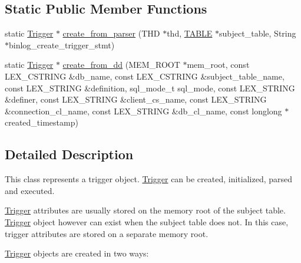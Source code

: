 \subsection*{Static Public Member Functions}
\begin{DoxyCompactItemize}
\item 
static \mbox{\hyperlink{classTrigger}{Trigger}} $\ast$ \mbox{\hyperlink{classTrigger_afa4975456fa6b8bef6cd1c695c64e33e}{create\+\_\+from\+\_\+parser}} (T\+HD $\ast$thd, \mbox{\hyperlink{structTABLE}{T\+A\+B\+LE}} $\ast$subject\+\_\+table, String $\ast$binlog\+\_\+create\+\_\+trigger\+\_\+stmt)
\item 
static \mbox{\hyperlink{classTrigger}{Trigger}} $\ast$ \mbox{\hyperlink{classTrigger_af25e592990988383f2df4f215b806ab3}{create\+\_\+from\+\_\+dd}} (M\+E\+M\+\_\+\+R\+O\+OT $\ast$mem\+\_\+root, const L\+E\+X\+\_\+\+C\+S\+T\+R\+I\+NG \&db\+\_\+name, const L\+E\+X\+\_\+\+C\+S\+T\+R\+I\+NG \&subject\+\_\+table\+\_\+name, const L\+E\+X\+\_\+\+S\+T\+R\+I\+NG \&definition, sql\+\_\+mode\+\_\+t sql\+\_\+mode, const L\+E\+X\+\_\+\+S\+T\+R\+I\+NG \&definer, const L\+E\+X\+\_\+\+S\+T\+R\+I\+NG \&client\+\_\+cs\+\_\+name, const L\+E\+X\+\_\+\+S\+T\+R\+I\+NG \&connection\+\_\+cl\+\_\+name, const L\+E\+X\+\_\+\+S\+T\+R\+I\+NG \&db\+\_\+cl\+\_\+name, const longlong $\ast$created\+\_\+timestamp)
\end{DoxyCompactItemize}


\subsection{Detailed Description}
This class represents a trigger object. \mbox{\hyperlink{classTrigger}{Trigger}} can be created, initialized, parsed and executed.

\mbox{\hyperlink{classTrigger}{Trigger}} attributes are usually stored on the memory root of the subject table. \mbox{\hyperlink{classTrigger}{Trigger}} object however can exist when the subject table does not. In this case, trigger attributes are stored on a separate memory root.

\mbox{\hyperlink{classTrigger}{Trigger}} objects are created in two ways\+:


